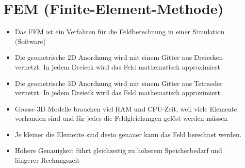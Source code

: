 \section{FEM (Finite-Element-Methode)}
\begin{itemize}
	\item Das FEM ist ein Verfahren für die Feldberechnung in einer Simulation (Software)
	\item Die geometrische 2D Anordnung wird mit einem Gitter aus Dreiecken vernetzt. In jedem Dreieck wird das Feld mathematisch approximiert. 
	\item Die geometrische 3D Anordnung wird mit einem Gitter aus Tetraeder vernetzt. In jedem Dreieck wird das Feld mathematisch approximiert. 
	\item Grosse 3D Modelle brauchen viel RAM und CPU-Zeit, weil viele Elemente vorhanden sind und für jedes die Feldgleichungen gelöst werden müssen
	\item Je kleiner die Elemente sind desto genauer kann das Feld berechnet werden. 
	\item Höhere Genauigkeit führt gleichzeitig zu höherem Speicherbedarf und längerer Rechungszeit
\end{itemize}
\clearpage
\pagebreak